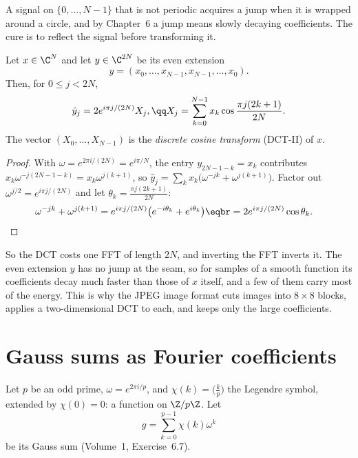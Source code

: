 A signal on $\{0,\dots,N-1\}$ that is not periodic acquires a jump when it is wrapped around a circle, and by
Chapter~6 a jump means slowly decaying coefficients. The cure is to reflect the signal before transforming it.

\begin{proposition}\label{prop:dct}
Let $x\in\C^N$ and let $y\in\C^{2N}$ be its even extension
\[
y=(x_0,\dots,x_{N-1},x_{N-1},\dots,x_0).
\]
Then, for $0\le j<2N$,
\[
\begin{gathered}\hat y_j=2e^{i\pi j/(2N)}X_j,\qq X_j=\sum_{k=0}^{N-1}x_k\cos\frac{\pi j(2k+1)}{2N}.\end{gathered}
\]
The vector $(X_0,\dots,X_{N-1})$ is the \emph{discrete cosine transform} (DCT-II) of $x$.
\end{proposition}
\begin{proof}
With $\omega=e^{2\pi i/(2N)}=e^{i\pi/N}$, the entry $y_{2N-1-k}=x_k$ contributes $x_k\omega^{-j(2N-1-k)}=x_k\omega^{j(k+1)}$, so
$\hat y_j=\sum_kx_k\bigl(\omega^{-jk}+\omega^{j(k+1)}\bigr)$. Factor out $\omega^{j/2}=e^{i\pi j/(2N)}$ and let $\theta_k=\frac{\pi j(2k+1)}{2N}$:
\[
\begin{aligned}\omega^{-jk}+\omega^{j(k+1)}&=e^{i\pi j/(2N)}\bigl(e^{-i\theta_k}+e^{i\theta_k}\bigr)\eqbr=2e^{i\pi j/(2N)}\cos\theta_k.\end{aligned}
\]
\end{proof}

So the DCT costs one FFT of length $2N$, and inverting the FFT inverts it. The even extension $y$ has no jump at the seam,
so for samples of a smooth function its coefficients decay much faster than those of $x$ itself, and a few of them carry most
of the energy. This is why the JPEG image format cuts images into $8\times8$ blocks, applies a two-dimensional DCT to each, and
keeps only the large coefficients.

\section{Gauss sums as Fourier coefficients}

Let $p$ be an odd prime, $\omega=e^{2\pi i/p}$, and $\chi(k)=\bigl(\frac kp\bigr)$ the Legendre symbol, extended by $\chi(0)=0$: a function on $\Z/p\Z$. Let
\[
g=\sum_{k=0}^{p-1}\chi(k)\omega^k
\]
be its Gauss sum (Volume~1, Exercise~6.7).


